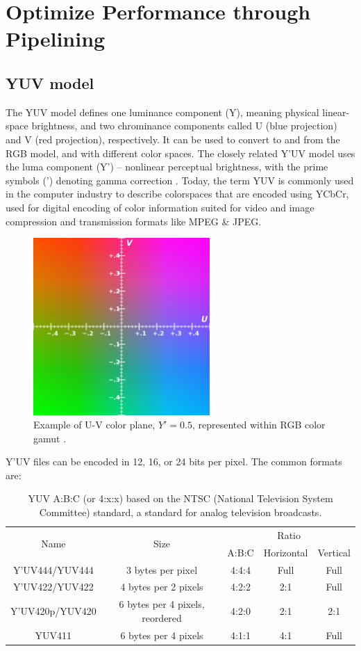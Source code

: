 \documentclass[a4paper,12pt,twoside]{article}
\begin{document}
\section{Optimize Performance through Pipelining}\label{S2}
\subsection{YUV model}
The YUV model defines one luminance component (Y), meaning physical linear-space brightness, and two chrominance components called U (blue projection) and V (red projection), respectively. It can be used to convert to and from the RGB model, and with different color spaces. The closely related Y'UV model uses the luma component (Y') – nonlinear perceptual brightness, with the prime symbols (') denoting gamma correction \cite{enwiki:1114229318}. Today, the term YUV is commonly used in the computer industry to describe colorspaces that are encoded using YCbCr, used for digital encoding of color information suited for video and image compression and transmission formats like MPEG \& JPEG.
\begin{figure}[H]
    \centering
    \includegraphics[width=0.6\textwidth]{images/10.png}
    \caption{Example of U-V color plane, $Y' = 0.5$, represented within RGB color gamut \cite{yuvsvg}.}
\end{figure}
Y'UV files can be encoded in 12, 16, or 24 bits per pixel. The common formats are:
\begin{table}[H]
    \centering
    \begin{tabular}{|c|c|c|c|c|}
        \hline
        \multirow{2}{*}{Name} & \multirow{2}{*}{Size} & \multicolumn{3}{c|}{Ratio}\\
        \cline{3-5}
        && A:B:C & Horizontal & Vertical\\
        \hline
        Y'UV444/YUV444 & 3 bytes per pixel & 4:4:4 & Full & Full \\
        \hline
        Y'UV422/YUV422 & 4 bytes per 2 pixels & 4:2:2 & 2:1 & Full \\
        \hline
        Y'UV420p/YUV420 & 6 bytes per 4 pixels, reordered & 4:2:0 & 2:1 & 2:1 \\
        \hline
        YUV411 & 6 bytes per 4 pixels & 4:1:1 & 4:1 & Full \\
        \hline
    \end{tabular}
    \caption{YUV A:B:C (or 4:x:x) based on the NTSC (National Television System Committee) standard, a standard for analog television broadcasts.}
\end{table}
\end{document}
